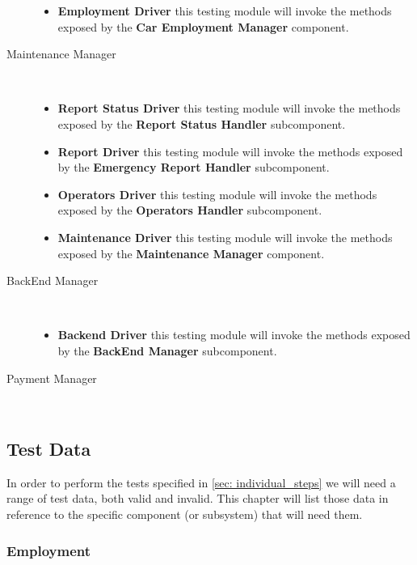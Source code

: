\begin{description}
\begin{itemize}
				\item \textbf{Employment Driver} this testing module will invoke the methods exposed by the \textbf{Car Employment Manager} component.
			\end{itemize}
		\item[Maintenance Manager]~\\
			\begin{itemize}
				\item \textbf{Report Status Driver} this testing module will invoke the methods exposed by the \textbf{Report Status Handler} subcomponent.
				\item \textbf{Report Driver} this testing module will invoke the methods exposed by the \textbf{Emergency Report Handler} subcomponent.
				\item \textbf{Operators Driver} this testing module will invoke the methods exposed by the \textbf{Operators Handler} subcomponent.
				\item \textbf{Maintenance Driver} this testing module will invoke the methods exposed by the \textbf{Maintenance Manager} component.
			\end{itemize}	
		\item[BackEnd Manager]~\\
			\begin{itemize}
				\item \textbf{Backend Driver} this testing module will invoke the methods exposed by the \textbf{BackEnd Manager} subcomponent.
			\end{itemize}
		\item[Payment Manager]~\\ %
		\end{description}
		
	
	
	
	\subsection{Test Data}
	
	In order to perform the tests specified in \autoref{sec: individual_steps} we will need a range of test data, both valid and invalid. This chapter will list those data in reference to the specific component (or subsystem) that will need them. %
	
	
	
		\subsubsection{Employment}
		
